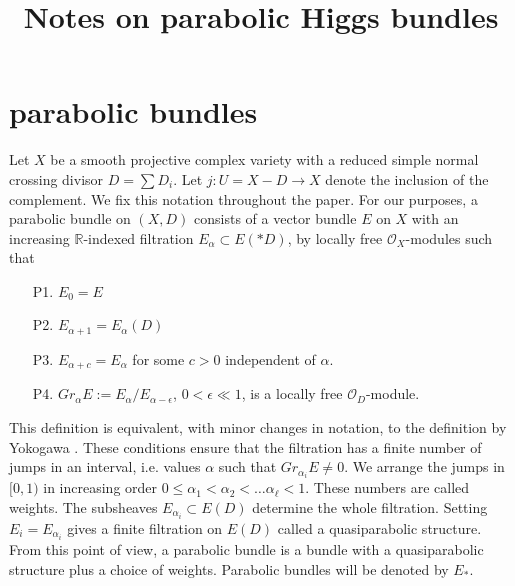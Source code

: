 \documentclass{amsart}
\newcommand {\R} {{\mathbb R}}
\newcommand {\OO} {{\mathcal O}}
\begin{document}
\title{Notes on parabolic Higgs bundles}
\address{Department of Mathematics\\
 Purdue University\\
 West Lafayette, IN 47907\\
U.S.A.}
 \maketitle

\section{parabolic bundles}

Let $X$ be a smooth projective complex variety with a reduced simple  normal crossing
divisor $D=\sum D_i$. Let $j:U=X-D\to X$ denote the inclusion of the complement. 
We fix this notation throughout the paper.
For our purposes, a parabolic bundle on $(X,D)$ consists of a
vector bundle $E$ on $X$ with an increasing $\R$-indexed filtration $E_\alpha\subset E(*D)$,
 by locally free $\OO_X$-modules such that
\begin{enumerate}
\item[P1.] $E_0=E$
\item[P2.] $E_{\alpha+1} = E_\alpha(D) $
\item[P3.] $E_{\alpha+c} = E_{\alpha}$ for some
  $c>0$ independent of $\alpha$.
\item[P4.] $Gr_\alpha E:= E_{\alpha}/E_{\alpha-\epsilon}$, $0<\epsilon\ll
  1$, is a locally free $\OO_D$-module. 
\end{enumerate}
This  definition is equivalent, with minor changes in notation, to the
definition by Yokogawa  \cite[3.1]{yokogawa}. 
These conditions ensure that the filtration has a finite number of
jumps in an interval, i.e.  values $\alpha$ such that $Gr_{\alpha_i}E\not=0$. 
We arrange the jumps in $[0,1)$ in increasing order  $0\le \alpha_1< \alpha_2<\ldots \alpha_\ell <1$.
These numbers are called weights.
The  subsheaves $E_{\alpha_i}\subset E(D)$ determine the whole filtration. 
Setting $E_i= E_{\alpha_i}$ gives a finite filtration on $E(D)$ called a
quasiparabolic structure. From this point of view, a parabolic
bundle  is  a bundle with a quasiparabolic structure plus a choice of
weights. Parabolic bundles will be denoted by $E_*$.
\end{document}

